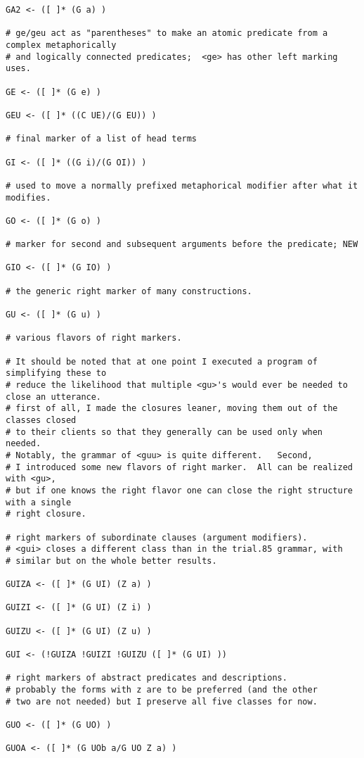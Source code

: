 \documentclass{article}
\begin{document}
\begin{verbatim}
GA2 <- ([ ]* (G a) )

# ge/geu act as "parentheses" to make an atomic predicate from a complex metaphorically
# and logically connected predicates;  <ge> has other left marking uses.

GE <- ([ ]* (G e) )

GEU <- ([ ]* ((C UE)/(G EU)) )

# final marker of a list of head terms

GI <- ([ ]* ((G i)/(G OI)) )

# used to move a normally prefixed metaphorical modifier after what it modifies.

GO <- ([ ]* (G o) )

# marker for second and subsequent arguments before the predicate; NEW

GIO <- ([ ]* (G IO) )

# the generic right marker of many constructions.

GU <- ([ ]* (G u) )

# various flavors of right markers.

# It should be noted that at one point I executed a program of simplifying these to
# reduce the likelihood that multiple <gu>'s would ever be needed to close an utterance.
# first of all, I made the closures leaner, moving them out of the classes closed
# to their clients so that they generally can be used only when needed. 
# Notably, the grammar of <guu> is quite different.   Second,
# I introduced some new flavors of right marker.  All can be realized with <gu>,
# but if one knows the right flavor one can close the right structure with a single
# right closure.

# right markers of subordinate clauses (argument modifiers).
# <gui> closes a different class than in the trial.85 grammar, with
# similar but on the whole better results.

GUIZA <- ([ ]* (G UI) (Z a) )

GUIZI <- ([ ]* (G UI) (Z i) )

GUIZU <- ([ ]* (G UI) (Z u) )

GUI <- (!GUIZA !GUIZI !GUIZU ([ ]* (G UI) ))

# right markers of abstract predicates and descriptions.
# probably the forms with z are to be preferred (and the other
# two are not needed) but I preserve all five classes for now. 

GUO <- ([ ]* (G UO) )

GUOA <- ([ ]* (G UOb a/G UO Z a) )


\end{verbatim}
\end{document}
